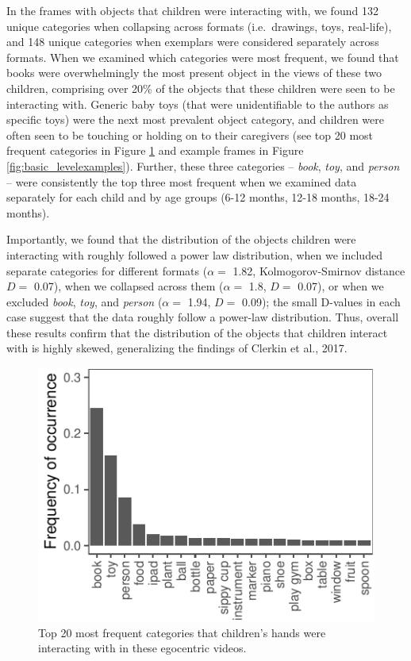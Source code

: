 \documentclass[10pt, letterpaper]{article}
\newenvironment{CodeChunk}{}{}
\begin{document}
In the frames with objects that children were interacting with, we found
132 unique categories when collapsing across formats (i.e.~drawings,
toys, real-life), and 148 unique categories when exemplars were
considered separately across formats. When we examined which categories
were most frequent, we found that books were overwhelmingly the most
present object in the views of these two children, comprising over 20\%
of the objects that these children were seen to be interacting with.
Generic baby toys (that were unidentifiable to the authors as specific
toys) were the next most prevalent object category, and children were
often seen to be touching or holding on to their caregivers (see top 20
most frequent categories in Figure \ref{fig:freq_interact} and example
frames in Figure \ref{fig:basic_levelexamples}). Further, these three
categories -- \emph{book}, \emph{toy}, and \emph{person} -- were
consistently the top three most frequent when we examined data
separately for each child and by age groups (6-12 months, 12-18 months,
18-24 months).

Importantly, we found that the distribution of the objects children were
interacting with roughly followed a power law distribution, when we
included separate categories for different formats (\(\alpha =\) 1.82,
Kolmogorov-Smirnov distance \(D=\) 0.07), when we collapsed across them
(\(\alpha =\) 1.8, \(D=\) 0.07), or when we excluded \emph{book},
\emph{toy}, and \emph{person} (\(\alpha =\) 1.94, \(D=\) 0.09); the
small D-values in each case suggest that the data roughly follow a
power-law distribution. Thus, overall these results confirm that the
distribution of the objects that children interact with is highly
skewed, generalizing the findings of Clerkin et al., 2017.

\begin{CodeChunk}
\begin{figure}[h]

{\centering \includegraphics{figs/freq_interact-1} 

}

\caption[Top 20 most frequent categories that children's hands were interacting with in these egocentric videos]{Top 20 most frequent categories that children's hands were interacting with in these egocentric videos.}\label{fig:freq_interact}
\end{figure}
\end{CodeChunk}
\end{document}

